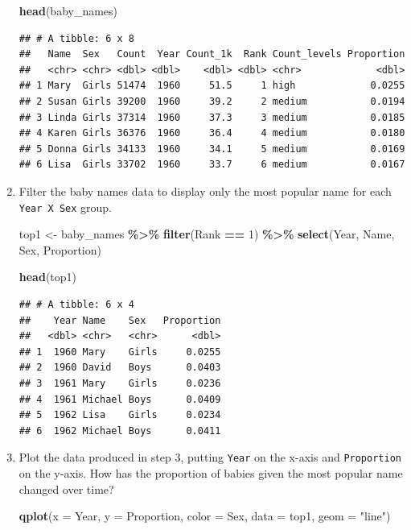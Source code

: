 \documentclass[
]{book}
\newenvironment{Shaded}{\begin{snugshade}}{\end{snugshade}}
\newcommand{\DataTypeTok}[1]{\textcolor[rgb]{0.13,0.29,0.53}{#1}}
\newcommand{\DecValTok}[1]{\textcolor[rgb]{0.00,0.00,0.81}{#1}}
\newcommand{\KeywordTok}[1]{\textcolor[rgb]{0.13,0.29,0.53}{\textbf{#1}}}
\newcommand{\NormalTok}[1]{#1}
\newcommand{\OperatorTok}[1]{\textcolor[rgb]{0.81,0.36,0.00}{\textbf{#1}}}
\newcommand{\StringTok}[1]{\textcolor[rgb]{0.31,0.60,0.02}{#1}}
\begin{document}
\begin{alert}
\begin{enumerate}
\begin{Shaded}
\begin{Highlighting}[]
\KeywordTok{head}\NormalTok{(baby\_names)}
\end{Highlighting}
\end{Shaded}

\begin{verbatim}
## # A tibble: 6 x 8
##   Name  Sex   Count  Year Count_1k  Rank Count_levels Proportion
##   <chr> <chr> <dbl> <dbl>    <dbl> <dbl> <chr>             <dbl>
## 1 Mary  Girls 51474  1960     51.5     1 high             0.0255
## 2 Susan Girls 39200  1960     39.2     2 medium           0.0194
## 3 Linda Girls 37314  1960     37.3     3 medium           0.0185
## 4 Karen Girls 36376  1960     36.4     4 medium           0.0180
## 5 Donna Girls 34133  1960     34.1     5 medium           0.0169
## 6 Lisa  Girls 33702  1960     33.7     6 medium           0.0167
\end{verbatim}
\item
  Filter the baby names data to display only the most popular name for each \texttt{Year\ X\ Sex} group.

\begin{Shaded}
\begin{Highlighting}[]
\NormalTok{top1 \textless{}{-}}\StringTok{ }
\StringTok{  }\NormalTok{baby\_names }\OperatorTok{\%\textgreater{}\%}
\StringTok{  }\KeywordTok{filter}\NormalTok{(Rank }\OperatorTok{==}\StringTok{ }\DecValTok{1}\NormalTok{) }\OperatorTok{\%\textgreater{}\%}
\StringTok{  }\KeywordTok{select}\NormalTok{(Year, Name, Sex, Proportion)}

\KeywordTok{head}\NormalTok{(top1)}
\end{Highlighting}
\end{Shaded}

\begin{verbatim}
## # A tibble: 6 x 4
##    Year Name    Sex   Proportion
##   <dbl> <chr>   <chr>      <dbl>
## 1  1960 Mary    Girls     0.0255
## 2  1960 David   Boys      0.0403
## 3  1961 Mary    Girls     0.0236
## 4  1961 Michael Boys      0.0409
## 5  1962 Lisa    Girls     0.0234
## 6  1962 Michael Boys      0.0411
\end{verbatim}
\item
  Plot the data produced in step 3, putting \texttt{Year} on the x-axis and \texttt{Proportion} on the y-axis. How has the proportion of babies given the most popular name changed over time?

\begin{Shaded}
\begin{Highlighting}[]
\KeywordTok{qplot}\NormalTok{(}\DataTypeTok{x =}\NormalTok{ Year, }
      \DataTypeTok{y =}\NormalTok{ Proportion, }
      \DataTypeTok{color =}\NormalTok{ Sex, }
      \DataTypeTok{data =}\NormalTok{ top1, }
      \DataTypeTok{geom =} \StringTok{"line"}\NormalTok{)}
\end{Highlighting}
\end{Shaded}


\end{enumerate}
\end{alert}
\end{document}
